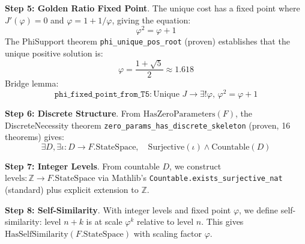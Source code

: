 \documentclass[12pt]{article}
\theoremstyle{remark}
\begin{document}
\textbf{Step 5: Golden Ratio Fixed Point}. The unique cost has a fixed point where $J'(\varphi)=0$ and $\varphi = 1 + 1/\varphi$, giving the equation:
\[
\varphi^2 = \varphi + 1
\]
The PhiSupport theorem \texttt{phi\_unique\_pos\_root} (proven) establishes that the unique positive solution is:
\[
\varphi = \frac{1+\sqrt{5}}{2} \approx 1.618
\]
Bridge lemma:
\[
\texttt{phi\_fixed\_point\_from\_T5}: \text{Unique } J \to \exists! \varphi,\, \varphi^2 = \varphi + 1
\]

\textbf{Step 6: Discrete Structure}. From $\mathrm{HasZeroParameters}(F)$, the DiscreteNecessity theorem \texttt{zero\_params\_has\_discrete\_skeleton} (proven, 16 theorems) gives:
\[
\exists D, \exists \iota: D \to F.\mathrm{StateSpace},\quad \text{Surjective}(\iota) \land \mathrm{Countable}(D)
\]

\textbf{Step 7: Integer Levels}. From countable $D$, we construct $\mathrm{levels}: \mathbb{Z} \to F.\mathrm{StateSpace}$ via Mathlib's \texttt{Countable.exists\_surjective\_nat} (standard) plus explicit extension to $\mathbb{Z}$.

\textbf{Step 8: Self-Similarity}. With integer levels and fixed point $\varphi$, we define self-similarity: level $n+k$ is at scale $\varphi^k$ relative to level $n$. This gives $\mathrm{HasSelfSimilarity}(F.\mathrm{StateSpace})$ with scaling factor $\varphi$.
\end{document}

